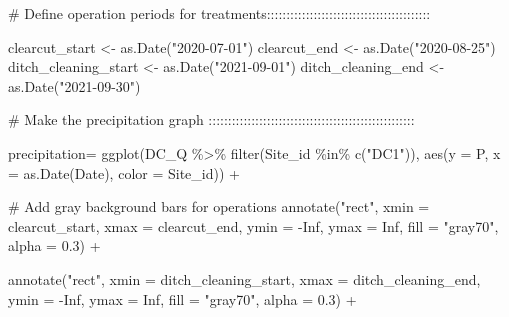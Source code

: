 \documentclass[
  letterpaper,
  DIV=11,
  numbers=noendperiod]{scrartcl}
\newenvironment{Shaded}{\begin{snugshade}}{\end{snugshade}}
\newcommand{\AttributeTok}[1]{\textcolor[rgb]{0.40,0.45,0.13}{#1}}
\newcommand{\CommentTok}[1]{\textcolor[rgb]{0.37,0.37,0.37}{#1}}
\newcommand{\ConstantTok}[1]{\textcolor[rgb]{0.56,0.35,0.01}{#1}}
\newcommand{\FloatTok}[1]{\textcolor[rgb]{0.68,0.00,0.00}{#1}}
\newcommand{\FunctionTok}[1]{\textcolor[rgb]{0.28,0.35,0.67}{#1}}
\newcommand{\NormalTok}[1]{\textcolor[rgb]{0.00,0.23,0.31}{#1}}
\newcommand{\OtherTok}[1]{\textcolor[rgb]{0.00,0.23,0.31}{#1}}
\newcommand{\SpecialCharTok}[1]{\textcolor[rgb]{0.37,0.37,0.37}{#1}}
\newcommand{\StringTok}[1]{\textcolor[rgb]{0.13,0.47,0.30}{#1}}
\begin{document}
\begin{Shaded}
\begin{Highlighting}[]
\CommentTok{\# Define operation periods for treatments::::::::::::::::::::::::::::::::::::::::::}
  
\NormalTok{clearcut\_start }\OtherTok{\textless{}{-}} \FunctionTok{as.Date}\NormalTok{(}\StringTok{"2020{-}07{-}01"}\NormalTok{)}
\NormalTok{clearcut\_end }\OtherTok{\textless{}{-}} \FunctionTok{as.Date}\NormalTok{(}\StringTok{"2020{-}08{-}25"}\NormalTok{)}
\NormalTok{ditch\_cleaning\_start }\OtherTok{\textless{}{-}} \FunctionTok{as.Date}\NormalTok{(}\StringTok{"2021{-}09{-}01"}\NormalTok{)}
\NormalTok{ditch\_cleaning\_end }\OtherTok{\textless{}{-}} \FunctionTok{as.Date}\NormalTok{(}\StringTok{"2021{-}09{-}30"}\NormalTok{)}

 
\CommentTok{\# Make the precipitation graph :::::::::::::::::::::::::::::::::::::::::::::::::::::}


\NormalTok{precipitation}\OtherTok{=} \FunctionTok{ggplot}\NormalTok{(DC\_Q }\SpecialCharTok{\%\textgreater{}\%}
         \FunctionTok{filter}\NormalTok{(Site\_id }\SpecialCharTok{\%in\%} \FunctionTok{c}\NormalTok{(}\StringTok{"DC1"}\NormalTok{)),}
       \FunctionTok{aes}\NormalTok{(}\AttributeTok{y =}\NormalTok{ P, }\AttributeTok{x =} \FunctionTok{as.Date}\NormalTok{(Date), }\AttributeTok{color =}\NormalTok{ Site\_id)) }\SpecialCharTok{+}
  
  \CommentTok{\# Add gray background bars for operations}
  \FunctionTok{annotate}\NormalTok{(}\StringTok{"rect"}\NormalTok{, }
           \AttributeTok{xmin =}\NormalTok{ clearcut\_start, }\AttributeTok{xmax =}\NormalTok{ clearcut\_end,}
           \AttributeTok{ymin =} \SpecialCharTok{{-}}\ConstantTok{Inf}\NormalTok{, }\AttributeTok{ymax =} \ConstantTok{Inf}\NormalTok{, }\AttributeTok{fill =} \StringTok{"gray70"}\NormalTok{, }\AttributeTok{alpha =} \FloatTok{0.3}\NormalTok{) }\SpecialCharTok{+}
  
  \FunctionTok{annotate}\NormalTok{(}\StringTok{"rect"}\NormalTok{, }
           \AttributeTok{xmin =}\NormalTok{ ditch\_cleaning\_start, }\AttributeTok{xmax =}\NormalTok{ ditch\_cleaning\_end,}
           \AttributeTok{ymin =} \SpecialCharTok{{-}}\ConstantTok{Inf}\NormalTok{, }\AttributeTok{ymax =} \ConstantTok{Inf}\NormalTok{, }\AttributeTok{fill =} \StringTok{"gray70"}\NormalTok{, }\AttributeTok{alpha =} \FloatTok{0.3}\NormalTok{) }\SpecialCharTok{+}
  

\end{Highlighting}
\end{Shaded}
\end{document}
